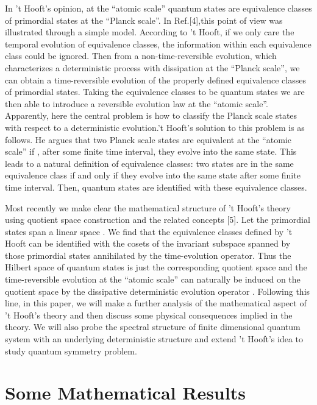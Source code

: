 \documentclass[a4paper,12pt]{article}
\begin{document}
In 't Hooft's opinion, at the ``atomic scale'' quantum states are
equivalence classes of primordial states at the ``Planck scale''. In
Ref.[4],this point of view was illustrated through a simple model. According
to 't Hooft, if we only care the temporal evolution of equivalence classes,
the information within each equivalence class could be ignored. Then from a
non-time-reversible evolution, which characterizes a deterministic process
with dissipation at the ``Planck scale'', we can obtain a time-reversible
evolution of the properly defined equivalence classes of primordial states.
Taking the equivalence classes to be quantum states we are then able to
introduce a reversible evolution law at the ``atomic scale''. Apparently,
here the central problem is how to classify the Planck scale states with
respect to a deterministic evolution.'t Hooft's solution to this problem is
as follows. He argues that two Planck scale states are equivalent at the
``atomic scale'' if , after some finite time interval, they evolve into the
same state. This leads to a natural definition of equivalence classes: two
states are in the same equivalence class if and only if they evolve into the
same state after some finite time interval. Then, quantum states are
identified with these equivalence classes.

Most recently we make clear the mathematical structure of 't Hooft's theory
using quotient space construction and the related concepts [5]. Let the
primordial states span a linear space . We find that the equivalence classes
defined by 't Hooft can be identified with the cosets of the invariant
subspace spanned by those primordial states annihilated by the
time-evolution operator. Thus the Hilbert space of quantum states is just
the corresponding quotient space and the time-reversible evolution at the
``atomic scale'' can naturally be induced on the quotient space by the
dissipative deterministic evolution operator . Following this line, in this
paper, we will make a further analysis of the mathematical aspect of 't
Hooft's theory and then discuss some physical consequences implied in the
theory. We will also probe the spectral structure of finite dimensional
quantum system with an underlying deterministic structure and extend 't
Hooft's idea to study quantum symmetry problem.

\section{Some Mathematical Results}
\end{document}
